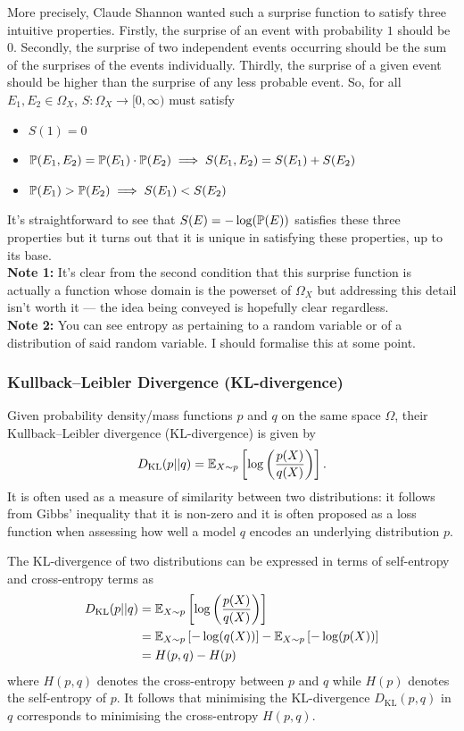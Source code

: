 \documentclass[11pt]{article}
\begin{document}
\begin{appendices}
\noindent More precisely, Claude Shannon wanted such a surprise function to satisfy three intuitive properties. Firstly, the surprise of an event with probability $1$ should be $0$. Secondly, the surprise of two independent events occurring should be the sum of the surprises of the events individually. Thirdly, the surprise of a given event should be higher than the surprise of any less probable event. So, for all $E_1,E_2\in\Omega_X$, $S:\Omega_X\rightarrow[0,\infty)$ must satisfy
\begin{itemize}
    \item $S(1)=0$
    \item $\P(E_1,E_2)=\P(E_1)\cdot\P(E_2)\implies S(E_1,E_2)=S(E_1)+S(E_2)$
    \item $\P(E_1)>\P(E_2)\implies S(E_1)<S(E_2)$
\end{itemize}

\noindent It's straightforward to see that $S(E)=-\log(\P(E))$ satisfies these three properties but it turns out that it is unique in satisfying these properties, up to its base.\\

\noindent\textbf{Note 1:} It's clear from the second condition that this surprise function is actually a function whose domain is the powerset of $\Omega_X$ but addressing this detail isn't worth it — the idea being conveyed is hopefully clear regardless.\\

\noindent\textbf{Note 2:} You can see entropy as pertaining to a random variable or of a distribution of said random variable. I should formalise this at some point.

\subsubsection{Kullback–Leibler Divergence (KL-divergence)}

Given probability density/mass functions $p$ and $q$ on the same space $\Omega$, their Kullback–Leibler divergence (KL-divergence) is given by
$$
D_{\text{KL}}(p||q)
=
\E_{X\sim p}\left[\log\left(\frac{p(X)}{q(X)}\right)\right].
$$
It is often used as a measure of similarity between two distributions: it follows from Gibbs' inequality that it is non-zero and it is often proposed as a loss function when assessing how well a model $q$ encodes an underlying distribution $p$.

The KL-divergence of two distributions can be expressed in terms of self-entropy and cross-entropy terms as
\begin{align*}
    D_{\text{KL}}(p||q)
    &=
    \E_{X\sim p}\left[\log\left(\frac{p(X)}{q(X)}\right)\right]\\
    &=
    \E_{X\sim p}\left[-\log(q(X))\right]-\E_{X\sim p}\left[-\log(p(X))\right]\\
    &=
    H(p,q)-H(p)
\end{align*}
where $H(p,q)$ denotes the cross-entropy between $p$ and $q$ while $H(p)$ denotes the self-entropy of $p$. It follows that minimising the KL-divergence $D_{\text{KL}}(p,q)$ in $q$ corresponds to minimising the cross-entropy $H(p,q)$.


\end{appendices}
\end{document}

